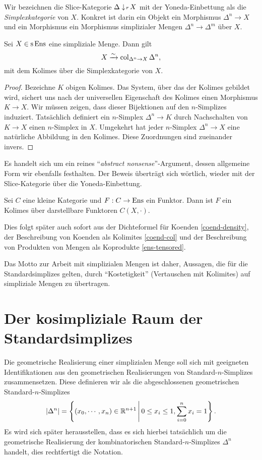 Wir bezeichnen die Slice-Kategorie $\Delta \downarrow \! {\scriptstyle r} \, X$ mit der
Yoneda-Einbettung als die \emph{Simplexkategorie} von $X$. Konkret ist
darin ein Objekt ein Morphismus $\Delta^n \to X$ und ein Morphismus
ein Morphismus simplizialer Mengen $\Delta^n \to \Delta^m$ über $X$.
\begin{lemma}[\cite{GJ}, I.2.1] \label{sset-col}
  Sei $X \in \operatorname{s}\operatorname{Ens}$ eine simpliziale Menge. Dann gilt
  \[ X \xrightarrow[]{\sim} \operatorname{col}_{\Delta^n \to X} \Delta^n, \]
  mit dem Kolimes über die Simplexkategorie von $X$.
\end{lemma}
\begin{proof}
  Bezeichne $K$ obigen Kolimes. Das System, über das der Kolimes
  gebildet wird, sichert uns nach der universellen Eigenschaft des
  Kolimes einen Morphismus $K \to X$. Wir müssen zeigen, dass dieser
  Bijektionen auf den $n$-Simplizes induziert. Tatsächlich definiert
  ein $n$-Simplex $\Delta^n \to K$ durch Nachschalten von $K \to X$
  einen $n$-Simplex in $X$. Umgekehrt hat jeder $n$-Simplex $\Delta^n
  \to X$ eine natürliche Abbildung in den Kolimes. Diese Zuordnungen
  sind zueinander invers.
\end{proof}
Es handelt sich um ein reines ``\emph{abstract nonsense}''-Argument,
dessen allgemeine Form wir ebenfalls festhalten. Der Beweis überträgt
sich wörtlich, wieder mit der Slice-Kategorie über die
Yoneda-Einbettung.
\begin{prop}[\cite{GJ}, I.2.1] \label{presheaf-colimit-representable}
  Sei $C$ eine kleine Kategorie und $F: C \to \operatorname{Ens}$ ein Funktor. Dann
  ist $F$ ein Kolimes über darstellbare Funktoren $C(X, \cdot)$.
\end{prop}
\begin{bem}
  Dies folgt später auch sofort aus der Dichteformel für Koenden
  \ref{coend-density}, der Beschreibung von Koenden als Kolimites
  \ref{coend-col} und der Beschreibung von Produkten von Mengen als
  Koprodukte \ref{ens-tensored}.
\end{bem}
Das Motto zur Arbeit mit simplizialen Mengen ist daher, Aussagen, die
für die Standardsimplizes gelten, durch ``Kostetigkeit'' (Vertauschen
mit Kolimites) auf simpliziale Mengen zu übertragen.

\section{Der kosimpliziale Raum der Standardsimplizes}

Die geometrische Realisierung einer simplizialen Menge soll sich mit
geeigneten Identifikationen aus den geometrischen Realisierungen von
Standard-$n$-Simplizes zusammensetzen. Diese definieren wir als die
abgeschlossenen geometrischen Standard-$n$-Simplizes
\[ |\Delta^n| = \left\{ (x_0, \cdots, x_n) \in \mathbb{R}^{n+1} \,\middle|\, 0 \leq x_i \leq 1, \sum_{i=0}^n x_i = 1 \right\}. \]
Es wird sich später herausstellen, dass es sich hierbei tatsächlich um
die geometrische Realisierung der kombinatorischen
Standard-$n$-Simplizes $\Delta^n$ handelt, dies rechtfertigt die
Notation.

